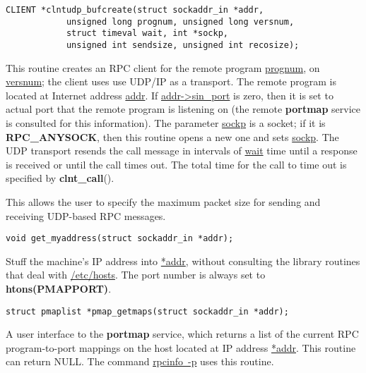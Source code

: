 \documentclass[]{article}
\let\realtextbf=\textbf
\renewcommand{\textbf}[1]{\textcolor{boldcolor}{\realtextbf{#1}}}
\renewcommand{\emph}[1]{\underline{#1}}
\begin{document}
\begin{verbatim}
CLIENT *clntudp_bufcreate(struct sockaddr_in *addr,
            unsigned long prognum, unsigned long versnum,
            struct timeval wait, int *sockp,
            unsigned int sendsize, unsigned int recosize);
\end{verbatim}

\begin{description}
\itemsep1pt\parskip0pt
\item[]
This routine creates an RPC client for the remote program
\emph{prognum}, on \emph{versnum}; the client uses use UDP/IP as a
transport. The remote program is located at Internet address
\emph{addr}. If \emph{addr-\textgreater{}sin\_port} is zero, then it is
set to actual port that the remote program is listening on (the remote
\textbf{portmap} service is consulted for this information). The
parameter \emph{sockp} is a socket; if it is \textbf{RPC\_ANYSOCK}, then
this routine opens a new one and sets \emph{sockp}. The UDP transport
resends the call message in intervals of \emph{wait} time until a
response is received or until the call times out. The total time for the
call to time out is specified by \textbf{clnt\_call}().
\end{description}

\begin{description}
\itemsep1pt\parskip0pt
\item[]
This allows the user to specify the maximum packet size for sending and
receiving UDP-based RPC messages.
\end{description}

\begin{verbatim}
void get_myaddress(struct sockaddr_in *addr);
\end{verbatim}

\begin{description}
\itemsep1pt\parskip0pt
\item[]
Stuff the machine's IP address into \emph{*addr}, without consulting the
library routines that deal with \emph{/etc/hosts}. The port number is
always set to \textbf{htons(PMAPPORT)}.
\end{description}

\begin{verbatim}
struct pmaplist *pmap_getmaps(struct sockaddr_in *addr);
\end{verbatim}

\begin{description}
\itemsep1pt\parskip0pt
\item[]
A user interface to the \textbf{portmap} service, which returns a list
of the current RPC program-to-port mappings on the host located at IP
address \emph{*addr}. This routine can return NULL. The command
\emph{rpcinfo~-p} uses this routine.
\end{description}
\end{document}
